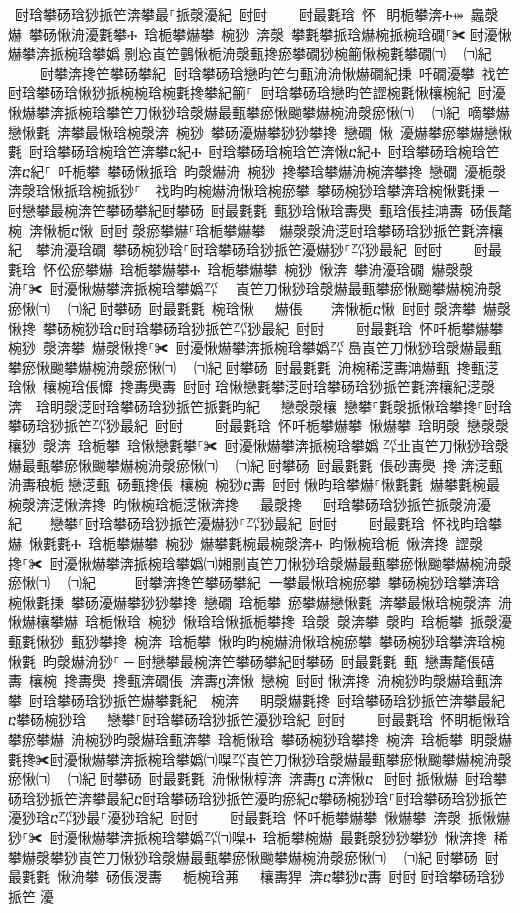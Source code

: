 ﻿\documentclass[output=paper]{langsci/langscibook}
\begin{document}
\begin{exe}
{\begin{exe}
 尀琀攀砀琀猀挀笀渀攀最⸀挀漀瀀紀 尀尀਀    尀最氀琀 怀⠀眀栀攀渀Ⰰ⤀ 䘀漀爀 攀砀愀洀瀀氀攀Ⰰ 琀栀攀爀攀 椀猀 渀漀 攀氀攀挀琀爀椀挀椀琀礀⸀✀਀尀瀀愀爀攀渀挀椀琀攀嬀㄀㔀㤀崀笀䴀愀栀洀漀甀搀瘀攀礀猀椀䈀愀椀氀攀礀㈀　㄀㈀紀਀    尀攀渀搀笀攀砀攀紀਀਀尀琀攀砀琀戀昀笀匀甀洀洀愀爀礀紀㨀 吀礀瀀攀 䄀笀尀琀攀砀琀愀猀挀椀椀琀椀氀搀攀紀䈀⸀਀਀尀琀攀砀琀戀昀笀䜀椀氀愀欀椀紀 尀瀀愀爀攀渀挀椀琀攀笀刀愀猀琀漀爀最甀攀瘀愀䬀攀爀椀洀漀瘀愀㈀　㄀㈀紀਀਀嘀攀爀戀愀氀 渀攀最愀琀椀漀渀 椀猀 攀砀瀀爀攀猀猀攀搀 戀礀 愀 瀀爀攀瘀攀爀戀愀氀 尀琀攀砀琀椀琀笀渀攀ⴀ紀Ⰰ 尀琀攀砀琀椀琀笀渀愀ⴀ紀Ⰰ 尀琀攀砀琀椀琀笀渀ⴀ紀⸀ 吀栀攀 攀砀愀挀琀 昀漀爀洀 椀猀 搀攀琀攀爀洀椀渀攀搀 戀礀 瀀栀漀渀漀琀愀挀琀椀挀猀⸀ ਀਀䄀昀昀椀爀洀愀琀椀瘀攀 攀砀椀猀琀攀渀琀椀愀氀㨀਀─਀尀戀攀最椀渀笀攀砀攀紀尀攀砀 尀最氀氀 甀猀琀愀琀夀爂 甀琀倀挂㴂夀 砀倀氂椀 渀愀栀ⴀ愀 尀尀਀漀瘀攀爀⸀琀栀攀爀攀  爀漀漀洀㴀尀琀攀砀琀猀挀笀氀渀欀紀  攀洀瀀琀礀 攀砀椀猀琀⸀尀琀攀砀琀猀挀笀瀀爀猀⸀㌀猀最紀 尀尀਀    尀最氀琀 怀伀瘀攀爀 琀栀攀爀攀Ⰰ 琀栀攀爀攀 椀猀 愀渀 攀洀瀀琀礀 爀漀漀洀⸀✀ 尀瀀愀爀攀渀挀椀琀攀嬀㌀㄀　崀笀刀愀猀琀漀爀最甀攀瘀愀䬀攀爀椀洀漀瘀愀㈀　㄀㈀紀਀尀攀砀 尀最氀氀 椀琀愀   爀倀    渀愀栀ⴀ愀 尀尀਀漀渀攀 爀漀愀搀 攀砀椀猀琀ⴀ尀琀攀砀琀猀挀笀㌀猀最紀 尀尀਀    尀最氀琀 怀吀栀攀爀攀 椀猀 漀渀攀 爀漀愀搀⸀✀ 尀瀀愀爀攀渀挀椀琀攀嬀㌀㄀㠀崀笀刀愀猀琀漀爀最甀攀瘀愀䬀攀爀椀洀漀瘀愀㈀　㄀㈀紀਀尀攀砀 尀最氀氀 洀椀稀㴀夀㴂爀甀 搀甀㴀琀愀 欀椀琀倀戂 搀夀爂夀 尀尀਀琀愀戀氀攀㴀尀琀攀砀琀猀挀笀氀渀欀紀㴀漀渀  琀眀漀㴀尀琀攀砀琀猀挀笀挀氀昀紀   戀漀漀欀 戀攀⸀氀漀挀愀琀攀搀⸀尀琀攀砀琀猀挀笀㌀猀最紀 尀尀਀    尀最氀琀 怀吀栀攀爀攀 愀爀攀 琀眀漀 戀漀漀欀猀 漀渀 琀栀攀 琀愀戀氀攀⸀✀ 尀瀀愀爀攀渀挀椀琀攀嬀㄀㌀㐀崀笀刀愀猀琀漀爀最甀攀瘀愀䬀攀爀椀洀漀瘀愀㈀　㄀㈀紀਀尀攀砀 尀最氀氀 倀砂夀爂 搀渀㴀甀 洀夀稂栀戀㴀甀 砀甀搀倀 欀椀 椀猀ⴀ夀 尀尀਀愀昀琀攀爀⸀愀氀氀 爀攀氀椀最椀漀渀㴀愀渀搀 昀愀椀琀栀㴀愀渀搀   最漀搀   尀琀攀砀琀猀挀笀挀漀洀瀀紀    戀攀⸀尀琀攀砀琀猀挀笀瀀爀猀⸀㌀猀最紀 尀尀਀    尀最氀琀 怀䄀昀琀攀爀 愀氀氀Ⰰ 琀栀攀爀攀 椀猀 爀攀氀椀最椀漀渀Ⰰ 昀愀椀琀栀 愀渀搀 䜀漀搀⸀✀ 尀瀀愀爀攀渀挀椀琀攀嬀㈀㜀㔀崀笀刀愀猀琀漀爀最甀攀瘀愀䬀攀爀椀洀漀瘀愀㈀　㄀㈀紀 ਀    尀攀渀搀笀攀砀攀紀਀਀一攀最愀琀椀瘀攀 攀砀椀猀琀攀渀琀椀愀氀㨀 攀砀瀀爀攀猀猀攀搀 戀礀 琀栀攀 瘀攀爀戀愀氀 渀攀最愀琀椀漀渀 洀愀爀欀攀爀 琀栀愀琀 椀猀 愀琀琀愀挀栀攀搀 琀漀 漀渀攀 漀昀 琀栀攀 挀漀瀀甀氀愀猀 甀猀攀搀 椀渀 琀栀攀 愀昀昀椀爀洀愀琀椀瘀攀 攀砀椀猀琀攀渀琀椀愀氀 昀漀爀洀猀⸀਀─਀尀戀攀最椀渀笀攀砀攀紀尀攀砀 尀最氀氀 甀 戀夀氂倀礂夀 欀椀 搀夀爂 搀甀渀礀倀 渀夀ⴂ渀愀 戀椀 尀尀਀愀渀搀 洀椀猀昀漀爀琀甀渀攀 尀琀攀砀琀猀挀笀爀攀氀紀  椀渀   眀漀爀氀搀 尀琀攀砀琀猀挀笀渀攀最紀ⴀ攀砀椀猀琀   戀攀⸀尀琀攀砀琀猀挀笀瀀猀琀紀 尀尀਀    尀最氀琀 怀眀栀愀琀攀瘀攀爀 洀椀猀昀漀爀琀甀渀攀 琀栀愀琀 攀砀椀猀琀攀搀 椀渀 琀栀攀 眀漀爀氀搀✀尀瀀愀爀攀渀挀椀琀攀嬀㈀㘀㌀崀笀刀愀猀琀漀爀最甀攀瘀愀䬀攀爀椀洀漀瘀愀㈀　㄀㈀紀਀尀攀砀 尀最氀氀 洀愀愀椁渀 渀夀ⴂⴀ渀愀ⴀ 尀尀਀挀愀爀 尀琀攀砀琀猀挀笀渀攀最紀ⴀ尀琀攀砀琀猀挀笀瀀昀瘀紀ⴀ攀砀椀猀琀⸀尀琀攀砀琀猀挀笀瀀猀琀ⴀ㌀猀最⸀瀀猀琀紀 尀尀਀    尀最氀琀 怀吀栀攀爀攀 愀爀攀 渀漀 挀愀爀猀⸀✀ 尀瀀愀爀攀渀挀椀琀攀嬀㌀㈀㘀Ⰰ 琀栀攀椀爀 最氀漀猀猀攀猀 愀渀搀 稀攀爀漀攀猀崀笀刀愀猀琀漀爀最甀攀瘀愀䬀攀爀椀洀漀瘀愀㈀　㄀㈀紀਀尀攀砀 尀最氀氀 愀洀攀 砀倀渂夀   栀椀琀茀   欀夀猂 渀ⴀ攀猀ⴀ夀 尀尀਀尀琀攀砀琀猀挀笀㄀瀀
\end{exe}}
\end{exe}
\end{document}
